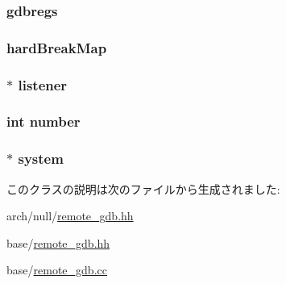 \label{classBaseRemoteGDB_a6f8059414f0228f0256115e024eeed4b}
\hypertarget{classBaseRemoteGDB_a4dbf55c54f47727c96b2cb5d00ca7936}{
\subsubsection[{gdbregs}]{ {\bf gdbregs}}}
\label{classBaseRemoteGDB_a4dbf55c54f47727c96b2cb5d00ca7936}
\hypertarget{classBaseRemoteGDB_a9786e8b1280562520a5041f18dd59b21}{
\subsubsection[{hardBreakMap}]{ {\bf hardBreakMap}}}
\label{classBaseRemoteGDB_a9786e8b1280562520a5041f18dd59b21}
\hypertarget{classBaseRemoteGDB_a70415b68fb0739613a991b92c4d127a5}{
\subsubsection[{listener}]{$\ast$ {\bf listener}}}
\label{classBaseRemoteGDB_a70415b68fb0739613a991b92c4d127a5}
\hypertarget{classBaseRemoteGDB_a7106e2abc437ad981830d14176d15f09}{
\subsubsection[{number}]{\setlength{\rightskip}{0pt plus 5cm}int {\bf number}}}
\label{classBaseRemoteGDB_a7106e2abc437ad981830d14176d15f09}
\hypertarget{classBaseRemoteGDB_af27ccd765f13a4b7bd119dc7579e2746}{
\subsubsection[{system}]{$\ast$ {\bf system}}}
\label{classBaseRemoteGDB_af27ccd765f13a4b7bd119dc7579e2746}


このクラスの説明は次のファイルから生成されました:\begin{DoxyCompactItemize}
\item 
arch/null/\hyperlink{arch_2null_2remote__gdb_8hh}{remote\_\-gdb.hh}\item 
base/\hyperlink{base_2remote__gdb_8hh}{remote\_\-gdb.hh}\item 
base/\hyperlink{base_2remote__gdb_8cc}{remote\_\-gdb.cc}\end{DoxyCompactItemize}
